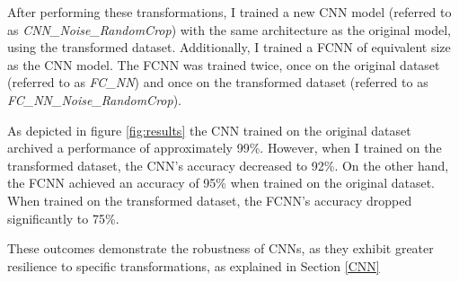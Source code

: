 After performing these transformations, I trained a new CNN model (referred to as \textit{CNN\_Noise\_RandomCrop}) with the same architecture as the original model, using the transformed dataset.
Additionally, I trained a FCNN of equivalent size as the CNN model.
The FCNN was trained twice, once on the original dataset (referred to as \textit{FC\_NN}) and once on the transformed dataset (referred to as \textit{FC\_NN\_Noise\_RandomCrop}).

As depicted in figure \ref{fig:results} the CNN trained on the original dataset archived a performance of approximately 99\%.
However, when I trained on the transformed dataset, the CNN's accuracy decreased to 92\%.
On the other hand, the FCNN achieved an accuracy of 95\% when trained on the original dataset.
When trained on the transformed dataset, the FCNN's accuracy dropped significantly to 75\%.

These outcomes demonstrate the robustness of CNNs, as they exhibit greater resilience to specific transformations, as explained in Section \ref{CNN}

